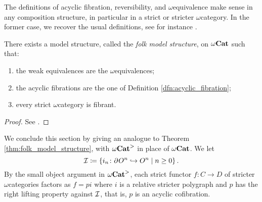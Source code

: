 \begin{comm}
    The definitions of acyclic fibration, reversibility, and \( \omega \)\nbd equivalence make sense in any composition structure, in particular in a strict or stricter \( \omega \)\nbd category.
    In the former case, we recover the usual definitions, see for instance \cite[19.2.3, 20.1.1, 20.1.11]{ara2025polygraphs}.
\end{comm}

\begin{thm} \label{thm:folk_model_structure}
    There exists a model structure, called the \emph{folk model structure}, on \( {\omega\mathbf{Cat}} \) such that:
    \begin{enumerate}
        \item the weak equivalences are the \( \omega \)\nbd equivalences;
        \item the acyclic fibrations are the one of Definition \ref{dfn:acyclic_fibration};
        \item every strict \( \omega \)\nbd category is fibrant. 
    \end{enumerate} 
\end{thm}
\begin{proof} 
    See \cite{lafont2010folk}.
\end{proof}

\noindent We conclude this section by giving an analogue to Theorem \ref{thm:folk_model_structure}, with \( {\omega\mathbf{Cat}}^> \) in place of \( {\omega\mathbf{Cat}} \).
We let 
\begin{equation*}
    \mathcal{I} \coloneqq \left\{ {i_n \colon \partial_{}^{} O^{n} \hookrightarrow O^{n} \mid n \geq 0} \right\}.
\end{equation*}
By the small object argument in \( {\omega\mathbf{Cat}}^> \), each strict functor \( f \colon C \to D \) of stricter \( \omega \)\nbd categories factors as \( f = p i \) where \( i \) is a relative stricter polygraph and \( p \) has the right lifting property against \( \mathcal{I} \), that is, \( p \) is an acyclic cofibration.

